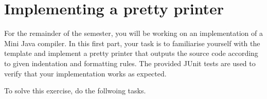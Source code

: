 
\subtitle{Semester project}


\makefancytitle

\section{Implementing a pretty printer}

For the remainder of the semester, you will be working on an implementation of a Mini Java compiler. In this first part, your task is to familiarise yourself with the template and implement a pretty printer that outputs the source code according to given indentation and formatting rules. The provided JUnit tests are used to verify that your implementation works as expected.

To solve this exercise, do the follwoing tasks.

